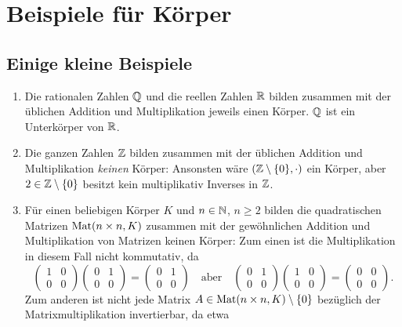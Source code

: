 \chapter{Beispiele für Körper}


\section{Einige kleine Beispiele}
\begin{enumerate}[leftmargin=*]
 \item
  Die rationalen Zahlen $\mathbb{Q}$ und die reellen Zahlen $\mathbb{R}$ bilden zusammen mit der üblichen Addition und Multiplikation jeweils einen Körper. $\mathbb{Q}$ ist ein Unterkörper von $\mathbb{R}$.
 \item
  Die ganzen Zahlen $\mathbb{Z}$ bilden zusammen mit der üblichen Addition und Multiplikation \emph{keinen} Körper: Ansonsten wäre $(\mathbb{Z}\setminus\{0\}, \cdot)$ ein Körper, aber $2 \in \mathbb{Z}\setminus\{0\}$ besitzt kein multiplikativ Inverses in $\mathbb{Z}$.
 \item
  Für einen beliebigen Körper $K$ und $n \in \mathbb{N}$, $n \geq 2$ bilden die quadratischen Matrizen $\mathrm{Mat}(n \times n, K)$ zusammen mit der gewöhnlichen Addition und Multiplikation von Matrizen keinen Körper: Zum einen ist die Multiplikation in diesem Fall nicht kommutativ, da
  \[
   \begin{pmatrix}
    1 & 0 \\
    0 & 0
   \end{pmatrix}
   \begin{pmatrix}
    0 & 1 \\
    0 & 0
   \end{pmatrix}
   =
   \begin{pmatrix}
    0 & 1 \\
    0 & 0
   \end{pmatrix}
   \quad\text{aber}\quad
   \begin{pmatrix}
    0 & 1 \\
    0 & 0
   \end{pmatrix}
   \begin{pmatrix}
    1 & 0 \\
    0 & 0
   \end{pmatrix}
   =
   \begin{pmatrix}
    0 & 0 \\
    0 & 0
   \end{pmatrix}.
  \]
  Zum anderen ist nicht jede Matrix $A \in \mathrm{Mat}(n \times n, K) \setminus \{0\}$ bezüglich der Matrixmultiplikation invertierbar, da etwa

\end{enumerate}
